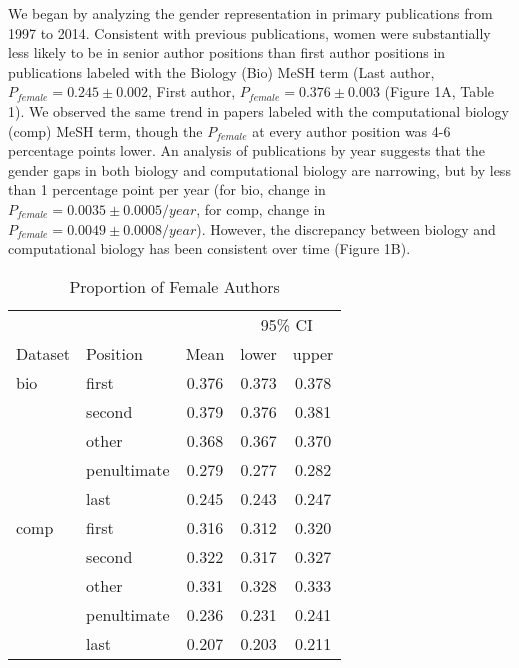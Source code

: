 \documentclass[10pt,letterpaper]{article}
\begin{document}
\begin{flushleft}
We began by analyzing the gender representation in primary publications from 1997 to 2014. Consistent with previous publications, women were substantially less likely to be in senior author positions than first author positions in publications labeled with the Biology (Bio) MeSH term (Last author, $P_{female} = 0.245 \pm 0.002$, First author, $P_{female} = 0.376 \pm 0.003$ (Figure 1A, Table 1). We observed the same trend in papers labeled with the computational biology (comp) MeSH term, though the $P_{female}$ at every author position was 4-6  percentage points lower. An analysis of publications by year suggests that the gender gaps in both biology and computational biology are narrowing, but by less than 1 percentage point  per year (for bio, change in $P_{female} = 0.0035 \pm 0.0005 / year$, for comp, change in $P_{female} = 0.0049 \pm 0.0008 / year$). However, the discrepancy between biology and computational biology has been consistent over time (Figure 1B).

\begin{table}[]
\centering
\caption{Proportion of Female Authors}
\label{Table 1}
\begin{tabular}{llccc}
\toprule
        &               &       & \multicolumn{2}{c}{95\% CI} \\
\cmidrule(r){4-5}
Dataset & Position      & Mean  & lower        & upper        \\
\midrule
bio     & first         & 0.376 & 0.373        & 0.378        \\
        & second        & 0.379 & 0.376        & 0.381        \\
        & other         & 0.368 & 0.367        & 0.370        \\
        & penultimate   & 0.279 & 0.277        & 0.282        \\
        & last          & 0.245 & 0.243        & 0.247        \\
comp    & first         & 0.316 & 0.312        & 0.320        \\
        & second        & 0.322 & 0.317        & 0.327        \\
        & other         & 0.331 & 0.328        & 0.333        \\
        & penultimate   & 0.236 & 0.231        & 0.241        \\
        & last          & 0.207 & 0.203        & 0.211        \\
\bottomrule
\end{tabular}
\end{table}


\end{flushleft}
\end{document}
